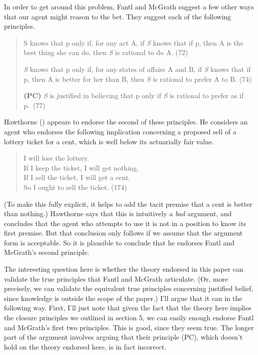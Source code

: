 \documentclass[
  10pt,
  letterpaper,
  DIV=11,
  numbers=noendperiod,
  twoside]{scrartcl}
\begin{document}
In order to get around this problem, Fantl and McGrath suggest a few
other ways that our agent might reason to the bet. They suggest each of
the following principles.

\begin{quote}
S knows that p only if, for any act A, if \emph{S} knows that if p, then
A is the best thing she can do, then \emph{S} is rational to do A. (72)

\emph{S} knows that p only if, for any states of affairs A and B, if
\emph{S} knows that if p, then A is better for her than B, then \emph{S}
is rational to prefer A to B. (74)

\textbf{(PC)} \emph{S} is justified in believing that p only if \emph{S}
is rational to prefer as if p.~(77)
\end{quote}

Hawthorne () appears to
endorse the second of these principles. He considers an agent who
endorses the following implication concerning a proposed sell of a
lottery ticket for a cent, which is well below its actuarially fair
value.

\begin{quote}
I will lose the lottery.\\
If I keep the ticket, I will get nothing.\\
If I sell the ticket, I will get a cent.\\
So I ought to sell the ticket. (174)
\end{quote}

(To make this fully explicit, it helps to add the tacit premise that a
cent is better than nothing.) Hawthorne says that this is intuitively a
\emph{bad} argument, and concludes that the agent who attempts to use it
is not in a position to know its first premise. But that conclusion only
follows if we assume that the argument form is acceptable. So it is
plausible to conclude that he endorses Fantl and McGrath's second
principle.

The interesting question here is whether the theory endorsed in this
paper can validate the true principles that Fantl and McGrath
articulate. (Or, more precisely, we can validate the equivalent true
principles concerning justified belief, since knowledge is outside the
scope of the paper.) I'll argue that it can in the following way. First,
I'll just note that given the fact that the theory here implies the
closure principles we outlined in section 5, we can easily enough
endorse Fantl and McGrath's first two principles. This is good, since
they seem true. The longer part of the argument involves arguing that
their principle (PC), which doesn't hold on the theory endorsed here, is
in fact incorrect.
\end{document}

